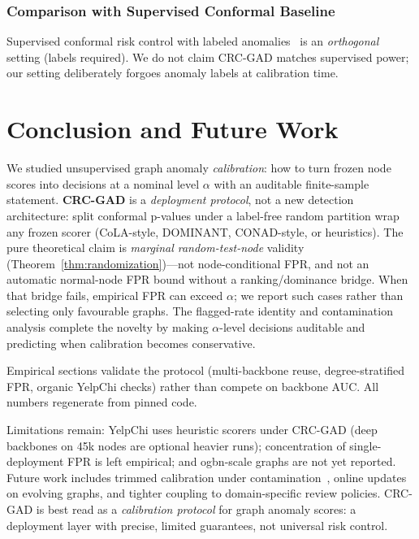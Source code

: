 \documentclass[a4paper]{cas-dc}
\theoremstyle{definition}
\begin{document}
\subsubsection{Comparison with Supervised Conformal Baseline}
\label{sec:abl_crcsgad}

Supervised conformal risk control with labeled anomalies~\cite{bates2023testing} is an \emph{orthogonal} setting (labels required). We do not claim CRC-GAD matches supervised power; our setting deliberately forgoes anomaly labels at calibration time.

\section{Conclusion and Future Work}
\label{sec:conclusion}

We studied unsupervised graph anomaly \emph{calibration}: how to turn frozen node scores into decisions at a nominal level $\alpha$ with an auditable finite-sample statement.
\textbf{CRC-GAD} is a \emph{deployment protocol}, not a new detection architecture: split conformal p-values under a label-free random partition wrap any frozen scorer (CoLA-style, DOMINANT, CONAD-style, or heuristics).
The pure theoretical claim is \emph{marginal random-test-node} validity (Theorem~\ref{thm:randomization})---not node-conditional FPR, and not an automatic normal-node FPR bound without a ranking/dominance bridge.
When that bridge fails, empirical FPR can exceed $\alpha$; we report such cases rather than selecting only favourable graphs.
The flagged-rate identity and contamination analysis complete the novelty by making $\alpha$-level decisions auditable and predicting when calibration becomes conservative.

Empirical sections validate the protocol (multi-backbone reuse, degree-stratified FPR, organic YelpChi checks) rather than compete on backbone AUC.
All numbers regenerate from pinned code.

Limitations remain: YelpChi uses heuristic scorers under CRC-GAD (deep backbones on 45k nodes are optional heavier runs); concentration of single-deployment FPR is left empirical; and ogbn-scale graphs are not yet reported.
Future work includes trimmed calibration under contamination~\cite{bates2023testing}, online updates on evolving graphs, and tighter coupling to domain-specific review policies.
CRC-GAD is best read as a \emph{calibration protocol} for graph anomaly scores: a deployment layer with precise, limited guarantees, not universal risk control.
\end{document}
